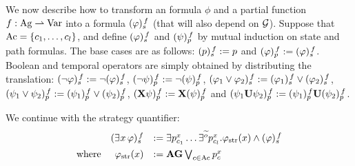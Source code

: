 \halfline
{}
 We now describe how to transform an \SLref formula $\phi$ and a partial
function $f:\Agf \partialto  \Varf$ into a \QCTLs
formula $\tr[f]{\phi}$ (that will also depend on $\CGS$).
Suppose that $\Mov=\{\mov_{1},\ldots,\mov_{\maxmov}\}$, and define
$\tr[f]{\phi}$ and $\trp[f]{\psi}$ by mutual induction on state and path formulas. 
The base cases are as follows:
$\tr[f]{p} 		 \egdef p$ and $\trp[f]{\phi} \egdef
\tr[f]{\phi}$. Boolean and temporal operators are simply obtained by
distributing the translation:
$\tr[f]{\neg \phi} 	 \egdef \neg \tr[f]{\phi}$, $\trp[f]{\neg
  \psi} \egdef \neg \trp[f]{\psi}$,
$\tr[f]{\phi_1\ou\phi_2}  \egdef \tr[f]{\phi_1}\ou\tr[f]{\phi_2}$,
$\trp[f]{\psi_1\ou\psi_2}  \egdef \trp[f]{\psi_1}\ou\trp[f]{\psi_2}$,
$\trp[f]{\X\psi}  \egdef \X\trp[f]{\psi}$ and $\trp[f]{\psi_1\until\psi_2}  \egdef \trp[f]{\psi_1}\until\trp[f]{\psi_2}$.


We continue with the strategy quantifier:
\[
  \begin{array}{lrl}
& \tr[f]{\Estratnd\phi}	& \egdef  \exists
                                  p_{\mov_{1}}^{\var}\ldots
                                  \exists^{\trobs{\obs}}
                                  p_{\mov_{\maxmov}}^{\var}. \phistrat
                                  \et \tr[f]{\phi}\\[5pt]
  \mbox{where} &  \phistrat & \egdef \A\always
                              \bigou_{\mov\in\Mov}p_{\mov}^{\var}
\end{array}
\]

